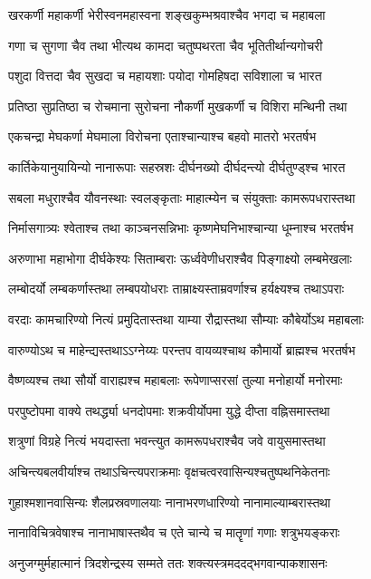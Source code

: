 \twolineshloka
{खरकर्णी महाकर्णी भेरीस्वनमहास्वना}
{शङ्खकुम्भश्रवाश्चैव भगदा च महाबला}


\twolineshloka
{गणा च सुगणा चैव तथा भीत्यथ कामदा}
{चतुष्पथरता चैव भूतितीर्थान्यगोचरी}


\twolineshloka
{पशुदा वित्तदा चैव सुखदा च महायशाः}
{पयोदा गोमहिषदा सविशाला च भारत}


\twolineshloka
{प्रतिष्ठा सुप्रतिष्ठा च रोचमाना सुरोचना}
{नौकर्णी मुखकर्णी च विशिरा मन्थिनी तथा}


\twolineshloka
{एकचन्द्रा मेघकर्णा मेघमाला विरोचना}
{एताश्चान्याश्च बहवो मातरो भरतर्षभ}


\twolineshloka
{कार्तिकेयानुयायिन्यो नानारूपाः सहस्रशः}
{दीर्घनख्यो दीर्घदन्त्यो दीर्घतुण्ड्श्च भारत}


\twolineshloka
{सबला मधुराश्चैव यौवनस्थाः स्वलङ्कृताः}
{माहात्म्येन च संयुक्ताः कामरूपधरास्तथा}


\twolineshloka
{निर्मासगात्र्यः श्वेताश्च तथा काञ्चनसन्निभाः}
{कृष्णमेघनिभाश्चान्या धूम्नाश्च भरतर्षभ}


\twolineshloka
{अरुणाभा महाभोगा दीर्घकेश्यः सिताम्बराः}
{ऊर्ध्ववेणीधराश्चैव पिङ्गाक्ष्यो लम्बमेखलाः}


\twolineshloka
{लम्बोदर्यो लम्बकर्णास्तथा लम्बपयोधराः}
{ताम्राक्ष्यस्ताम्रवर्णाश्च हर्यक्ष्यश्च तथाऽपराः}


\twolineshloka
{वरदाः कामचारिण्यो नित्यं प्रमुदितास्तथा}
{याम्या रौद्रास्तथा सौम्याः कौबेर्योऽथ महाबलाः}


\twolineshloka
{वारुण्योऽथ च माहेन्द्यस्तथाऽऽग्नेय्यः परन्तप}
{वायव्यश्चाथ कौमार्यो ब्राह्मश्च भरतर्षभ}


\twolineshloka
{वैष्णव्यश्च तथा सौर्यो वाराह्यश्च महाबलाः}
{रूपेणाप्सरसां तुल्या मनोहार्यो मनोरमाः}


\twolineshloka
{परपुष्टोपमा वाक्ये तथर्द्ध्या धनदोपमाः}
{शक्रवीर्योपमा युद्धे दीप्ता वह्निसमास्तथा}


\twolineshloka
{शत्रुणां विग्रहे नित्यं भयदास्ता भवन्त्युत}
{कामरूपधराश्चैव जवे वायुसमास्तथा}


\twolineshloka
{अचिन्त्यबलवीर्याश्च तथाऽचिन्त्यपराक्रमाः}
{वृक्षचत्वरवासिन्यश्चतुष्पथनिकेतनाः}


\twolineshloka
{गुहाश्मशानवासिन्यः शैलप्रस्रवणालयाः}
{नानाभरणधारिण्यो नानामाल्याम्बरास्तथा}


\twolineshloka
{नानाविचित्रवेषाश्च नानाभाषास्तथैव च}
{एते चान्ये च मातॄणां गणाः शत्रुभयङ्कराः}


\twolineshloka
{अनुजग्मुर्महात्मानं त्रिदशेन्द्रस्य सम्मते}
{ततः शक्त्यस्त्रमददद्भगवान्पाकशासनः}


